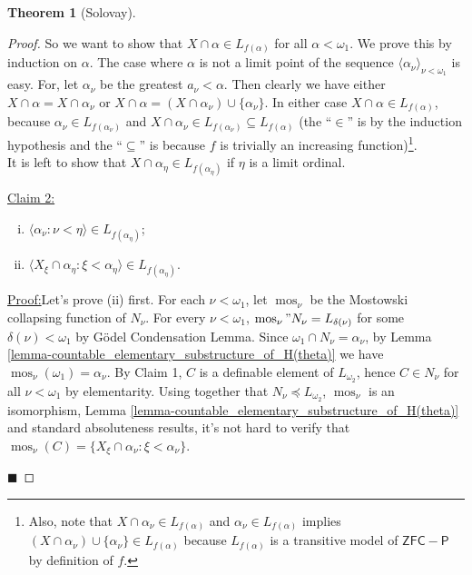 \documentclass[12pt,a4paper]{report}
\theoremstyle{definition}
\newtheorem{theorem}{Theorem}[chapter] %
\theoremstyle{num.custom-title}
\newenvironment{claim}[1]{\par\noindent\underline{Claim#1:}\space}{} %
\newenvironment{claimproof}[1]{\par\noindent\underline{Proof:}\space#1}{\leavevmode\unskip\penalty9999 \hbox{}\nobreak\hfill\quad\hbox{$\blacksquare$}} %
\DeclareMathOperator{\sse}{\subseteq}
\DeclareMathOperator{\mos}{mos}
\begin{document}
\begin{theorem}[Solovay]
\begin{proof}
So we want to show that $X \cap \alpha \in L_{f(\alpha)}$ for all $\alpha < \omega_1$. We prove this by induction on $\alpha$. The case where $\alpha$ is not a limit point of the sequence $\langle \alpha_\nu \rangle_{\nu < \omega_1}$ is easy. For, let $\alpha_\nu$ be the greatest $a_\nu < \alpha$. Then clearly we have either $X \cap \alpha = X \cap \alpha_\nu$ or $X \cap \alpha = (X \cap \alpha_\nu) \cup \{\alpha_\nu\}$. In either case $X \cap \alpha \in L_{f(\alpha)}$, because $\alpha_\nu \in L_{f(\alpha_\nu)}$ and $X \cap \alpha_\nu \in L_{f(\alpha_\nu)} \sse L_{f(\alpha)}$ (the ``$\in$'' is by the induction hypothesis and the ``$\sse$'' is because $f$ is trivially an increasing function)\footnote{Also, note that $X \cap \alpha_\nu \in L_{f(\alpha)}$ and $\alpha_\nu \in L_{f(\alpha)}$ implies $(X \cap \alpha_\nu) \cup \{\alpha_\nu\} \in L_{f(\alpha)}$ because $L_{f(\alpha)}$ is a transitive model of $\mathsf{ZFC-P}$ by definition of $f$.}.\\
It is left to show that $X \cap \alpha_\eta \in L_{f(\alpha_\eta)}$ if $\eta$ is a limit ordinal.
\begin{claim}{ 2}
\begin{enumerate}[(i)]
\item $\langle \alpha_\nu : \nu < \eta \rangle \in L_{f(\alpha_\eta)}$;
\item $\langle X_\xi \cap \alpha_\eta : \xi < \alpha_\eta \rangle \in L_{f(\alpha_\eta)}$.
\end{enumerate}
\begin{claimproof}
Let's prove (ii) first. For each $\nu < \omega_1$, let $\mos_\nu$ be the Mostowski collapsing function of $N_\nu$. For every $\nu < \omega_1$, $\mos_\nu "N_\nu = L_{\delta(\nu)}$ for some $\delta(\nu) < \omega_1$ by Gödel Condensation Lemma. Since $\omega_1 \cap N_\nu = \alpha_\nu$, by Lemma \ref{lemma-countable_elementary_substructure_of_H(theta)} we have $\mos_\nu(\omega_1) = \alpha_\nu$. By Claim 1, $C$ is a definable element of $L_{\omega_2}$, hence $C \in N_\nu$ for all $\nu < \omega_1$ by elementarity. Using together that $N_\nu \preceq L_{\omega_2}$, $\mos_\nu$ is an isomorphism, Lemma \ref{lemma-countable_elementary_substructure_of_H(theta)} and standard absoluteness results, it's not hard to verify that $\mos_\nu(C) = \{ X_\xi \cap \alpha_\nu : \xi < \alpha_\nu \}$.


\end{claimproof}
\end{claim}
\end{proof}
\end{theorem}
\end{document}

